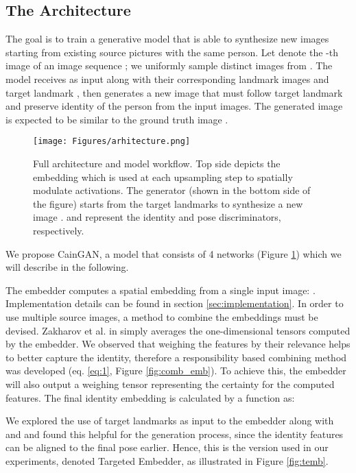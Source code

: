\documentclass[11pt,a4paper]{article}
\begin{document}
\subsection{The Architecture}
The goal is to train a generative model that is able to synthesize new images starting from  existing source pictures with the same person. Let  denote the -th image of an image sequence ; we uniformly sample  distinct images from . The model receives as input  along with their corresponding landmark images \cite{bulat2017far}  and target landmark , then generates a new image  that must follow target landmark and preserve identity of the person from the  input images. The generated image is expected to be similar to the ground truth image .

\begin{figure}[!t]
    \centering
    \texttt{[image: Figures/arhitecture.png]}
    \caption{Full architecture and model workflow. Top side depicts the embedding which is used at each upsampling step to spatially modulate activations. The generator (shown in the bottom side of the figure) starts from the target landmarks  to synthesize a new image .  and  represent the identity and pose discriminators, respectively.}
    \label{fig:full_arhi}
\end{figure}

We propose CainGAN, a model that consists of 4 networks (Figure \ref{fig:full_arhi}) which we will describe in the following.  

The embedder computes a spatial embedding  from a single input image: . Implementation details can be found in section \ref{sec:implementation}. In order to use multiple source images, a method to combine the embeddings must be devised. Zakharov et al. in \cite{zakharov2019fewshot} simply averages the one-dimensional tensors computed by the embedder. We observed that weighing the features by their relevance helps to better capture the identity, therefore a responsibility based combining method was developed (eq. \eqref{eq:1}, Figure \ref{fig:comb_emb}). To achieve this, the embedder will also output a weighing tensor  representing the certainty for the computed features. The final identity embedding is calculated by a function  as:
  
We explored the use of target landmarks  as input to the embedder along with  and  and found this helpful for the generation process, since the identity features can be aligned to the final pose earlier. Hence, this is the version used in our experiments, denoted Targeted Embedder, as illustrated in Figure \ref{fig:temb}.
\end{document}
